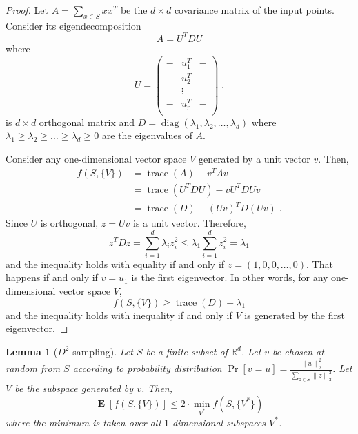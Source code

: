 \documentclass{article}
\newtheorem{lemma}[theorem]{Lemma}
\newcommand{\R}{\mathbb{R}}
\newcommand{\norm}[1]{\left\|#1\right\|}
\DeclareMathOperator*{\diag}{diag}
\DeclareMathOperator*{\trace}{trace}
\DeclareMathOperator*{\Exp}{\mathbf{E}}
\begin{document}
\begin{proof}
Let $A = \sum_{x \in S} xx^T$ be the $d \times d$
covariance matrix of the input points. Consider its eigendecomposition
$$
A = U^T D U
$$
where
$$
U =
\begin{pmatrix}
- & u_1^T & - \\
- & u_2^T & - \\
  & \vdots & \\
- & u_r^T & - \\
\end{pmatrix} \; .
$$
is $d \times d$ orthogonal matrix and $D = \diag(\lambda_1,
\lambda_2, \dots, \lambda_d)$ where $\lambda_1 \ge \lambda_2 \ge \dots \ge
\lambda_d \ge 0$ are the eigenvalues of $A$.

Consider any one-dimensional vector space $V$ generated by a unit vector $v$.
Then,
\begin{align*}
f(S, \{V\})
& = \trace(A) - v^T A v \\
& = \trace(U^T D U) - v U^T D U v \\
& = \trace(D) - (Uv)^T D (Uv) \; .
\end{align*}
Since $U$ is orthogonal, $z=Uv$ is a unit vector. Therefore,
$$
z^T D z = \sum_{i=1}^d \lambda_i z_i^2 \le \lambda_1 \sum_{i=1}^d z_i^2 = \lambda_1
$$
and the inequality holds with equality if and only if $z=(1,0,0,\dots,0)$.
That happens if and only if $v=u_1$ is the first eigenvector.
In other words, for any one-dimensional vector space $V$,
$$
f(S, \{V\}) \ge \trace(D) - \lambda_1
$$
and the inequality holds with inequality if and only if $V$ is generated
by the first eigenvector.
\end{proof}

\begin{lemma}[$D^2$ sampling]
Let $S$ be a finite subset of $\R^d$. Let $v$ be chosen at random from $S$
according to probability distribution $\Pr[v = u] = \frac{\norm{u}_2^2}{\sum_{z \in S} \norm{z}_2^2}$.
Let $V$ be the subspace generated by $v$. Then,
$$
\Exp[f(S,\{V\})] \le 2 \cdot \min_{V^*} f(S, \{V^*\})
$$
where the minimum is taken over all $1$-dimensional subspaces $V^*$.
\end{lemma}
\end{document}
